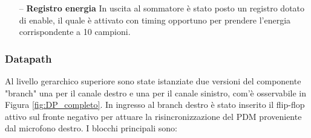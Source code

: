 \documentclass[a4paper, titlepage]{article}
\begin{document}
\begin{itemize}
     \item [--] \textbf{Registro energia}
     In uscita al sommatore è stato posto un registro dotato di enable, il quale è attivato con timing opportuno per prendere l'energia corrispondente a 10 campioni.
    \newline
\end{itemize}
\subsubsection{\textbf{Datapath}}
Al livello gerarchico superiore sono state istanziate due versioni del componente "branch" una per il canale destro e una per il canale sinistro, com'è osservabile in Figura \ref{fig:DP_completo}. In ingresso al branch destro è stato inserito il flip-flop attivo sul fronte negativo per attuare la risincronizzazione del PDM proveniente dal microfono destro.
I blocchi principali sono: 
\newline
\end{document}
